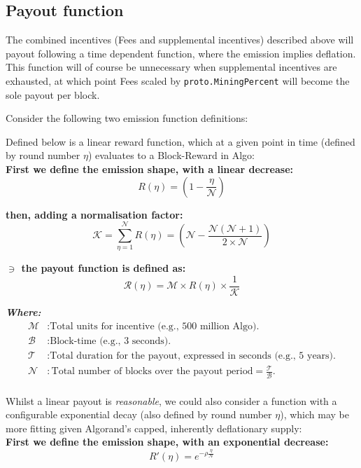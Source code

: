 \documentclass[11pt,a4paper]{article}
\begin{document}
\pagebreak

\subsection{Payout function}
The combined incentives (Fees and supplemental incentives) described above will payout following a time dependent 
function, where the emission implies deflation. This function will of course be unnecessary when supplemental incentives
are exhausted, at which point Fees scaled by \texttt{proto.MiningPercent} will become the sole payout per block.

Consider the following two emission function definitions:

Defined below is a linear reward function, which at a given point in time (defined by round number $\eta$) evaluates to 
a \gls{Block-Reward} in Algo:\\

\textbf{First we define the emission shape, with a linear decrease:}
\[
R(\eta) = (1- \frac{\eta}{\mathcal{N}})
\]

\textbf{then, adding a normalisation factor:}
\[
\mathcal{K} = \sum_{\eta=1}^\mathcal{N}R(\eta)=(\mathcal{N} -  \frac{\mathcal{N}(\mathcal{N}+1)}{2\times \mathcal{N}})  
\]

\textbf{$\ni$ the payout function is defined as:}
\[
\mathcal{R}(\eta) = \mathcal{M} \times R(\eta) \times \frac{1}{\mathcal{K}}
\]

\textbf{\emph{Where:}}
\begin{align*}
    \mathcal{M} & : \text{Total units for incentive (e.g., 500 million Algo).} \\
    \mathcal{B} & : \text{Block-time (e.g., 3 seconds).} \\
    \mathcal{T} & : \text{Total duration for the payout, expressed in seconds (e.g., 5 years).} \\
    \mathcal{N} & : \text{Total number of blocks over the payout period} = \frac{\mathcal{T}}{\mathcal{B}}.\\
\end{align*}

Whilst a linear payout is \textit{reasonable}, we could also consider a function with a configurable exponential decay 
(also defined by round number $\eta$), which may be more fitting given Algorand's capped, inherently deflationary 
supply: \\ 

\textbf{First we define the emission shape, with an exponential decrease:}
\[
R'(\eta)= e^{-\rho\frac{\eta}{\mathcal{N}}}
\]
\end{document}
